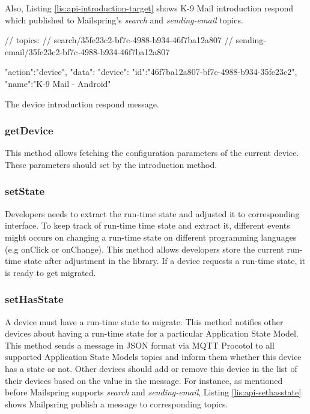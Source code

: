 Also, Listing \ref{lis:api-introduction-target} shows K-9 Mail introduction respond which  published to Mailspring's \textit{search} and \textit{sending-email} topics.

\FloatBarrier
\begin{code}
\begin{js2}
// topics:
// search/35fe23c2-bf7c-4988-b934-46f7ba12a807
// sending-email/35fe23c2-bf7c-4988-b934-46f7ba12a807
\end{js2}

\begin{json}
{
   "action":"device",
   "data":{
      "device":{
         "id":"46f7ba12a807-bf7c-4988-b934-35fe23c2",
         "name":"K-9 Mail - Android"
      }
   }
}
\end{json}
\caption{The device introduction respond message.}
\label{lis:api-introduction-target}
\end{code}
\FloatBarrier


\subsubsection{getDevice}
This method allows fetching the configuration parameters of the current device. These parameters should set by the introduction method.

\subsubsection{setState}
Developers needs to extract the run-time state and adjusted it to corresponding interface.
To keep track of run-time time state and extract it, different events might occurs on changing a run-time state on different programming languages (e.g onClick or onChange).
This method allows developers store the current run-time state after adjustment in the library. If a device requests a run-time state, it is ready to get migrated. 

\subsubsection{setHasState}
A device must have a run-time state to migrate. This method notifies other devices about having a run-time state for a particular Application State Model. This method sends a message in JSON format via MQTT Procotol to all supported Application State Models topics and inform them whether this device has a state or not. Other devices should add or remove this device in the list of their devices based on the value in the message. For instance, as mentioned before Mailspring supports \textit{search} and \textit{sending-email}, Listing \ref{lis:api-sethasstate} shows Mailpsring publish a message to corresponding topics.



